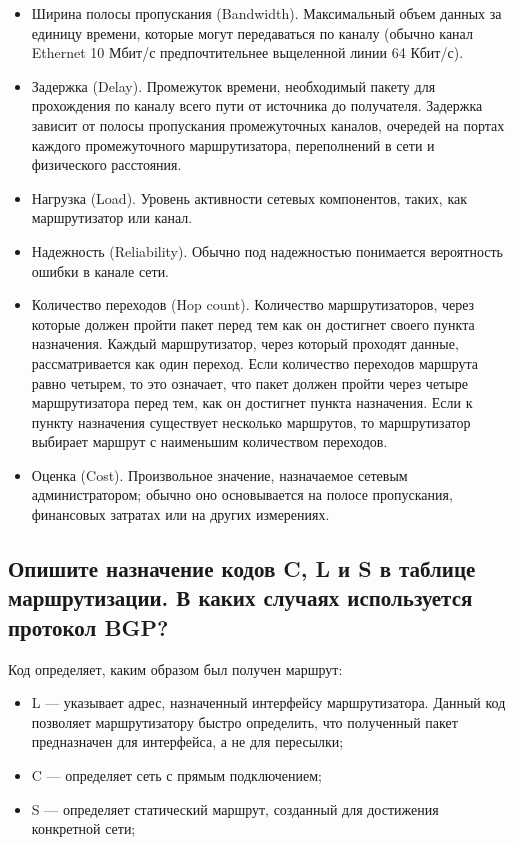 \begin{itemize}
    \item Ширина полосы пропускания (Bandwidth).
    Максимальный объем данных за единицу времени,
    которые могут передаваться по каналу
    (обычно канал Ethernet 10 Мбит/с предпочтительнее вьщеленной
    линии 64 Кбит/с).
    \item Задержка (Delay). Промежуток времени, необходимый пакету
    для прохождения по каналу всего пути от источника до получателя.
    Задержка зависит от полосы пропускания промежуточных каналов,
    очередей на портах каждого промежуточного маршрутизатора,
    переполнений в сети и физического расстояния.
    \item Нагрузка (Load). Уровень активности сетевых компонентов, таких,
    как маршрутизатор или канал.
    \item Надежность (Reliability). Обычно под надежностью понимается
    вероятность ошибки в канале сети.
    \item Количество переходов (Hop count). Количество маршрутизаторов,
    через которые должен пройти пакет перед тем как он достигнет своего
    пункта назначения. Каждый маршрутизатор, через который проходят
    данные, рассматривается как один переход.
    Если количество переходов маршрута равно четырем, то это означает,
    что пакет должен пройти через четыре маршрутизатора перед тем,
    как он достигнет пункта назначения. Если к пункту назначения
    существует несколько маршрутов, то маршрутизатор выбирает маршрут
    с наименьшим количеством переходов.
    \item Оценка (Cost). Произвольное значение, назначаемое сетевым
    администратором; обычно оно основывается на полосе пропускания,
    финансовых затратах или на других измерениях.
\end{itemize}

\subsection{Опишите назначение кодов C, L и S в таблице маршрутизации.
В каких случаях используется протокол BGP?}

Код определяет, каким образом был получен маршрут:
\begin{itemize}
    \item L --- указывает адрес, назначенный интерфейсу маршрутизатора.
    Данный код позволяет маршрутизатору быстро определить,
    что полученный пакет предназначен для интерфейса, а не для пересылки;
    \item C --- определяет сеть с прямым подключением;
    \item S --- определяет статический маршрут,
    созданный для достижения конкретной сети;
\end{itemize}

